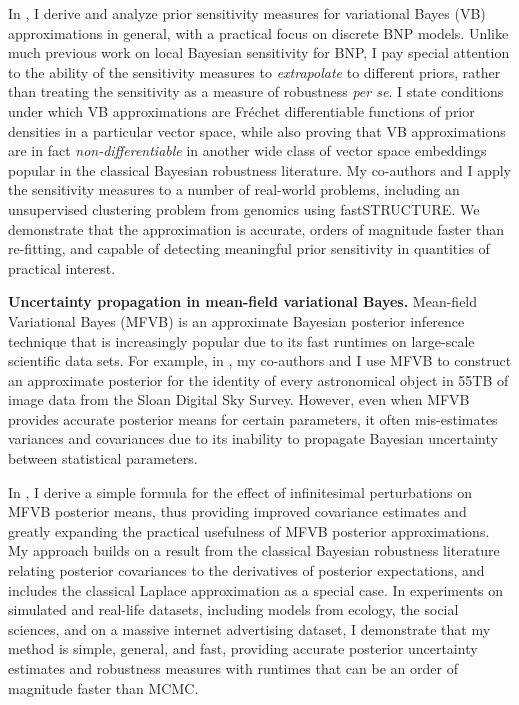In \citet{giordano:2021:bnpsensitivity}, I derive and analyze prior sensitivity
measures for variational Bayes (VB) approximations in general, with a practical
focus on discrete BNP models. Unlike much previous work on local Bayesian
sensitivity for BNP, I pay special
attention to the ability of the sensitivity measures to \emph{extrapolate} to
different priors, rather than treating the sensitivity as a measure of
robustness \textit{per se}.  I state conditions under which VB approximations
are Fr{\'e}chet differentiable functions of prior densities in a particular
vector space, while also proving that VB approximations are in fact
\emph{non-differentiable} in another wide class of vector space embeddings
popular in the classical Bayesian robustness literature.
My co-authors and I apply the sensitivity measures to a number of real-world
problems, including an unsupervised clustering problem from genomics using
fastSTRUCTURE.  We demonstrate that the approximation is accurate, orders of
magnitude faster than re-fitting, and capable of detecting meaningful prior
sensitivity in quantities of practical interest.

\textbf{Uncertainty propagation in mean-field variational Bayes.}
%
Mean-field Variational Bayes (MFVB) is an approximate Bayesian posterior
inference technique that is increasingly popular due to its fast runtimes on
large-scale scientific data sets. For example, in
\citet{regier:2019:cataloging}, my co-authors and I use MFVB to construct an
approximate posterior for the identity of every astronomical object in 55TB
of image data from the Sloan Digital Sky Survey.  However, even when MFVB provides
accurate posterior means for certain parameters, it often mis-estimates
variances and covariances due to its inability to propagate Bayesian uncertainty
between statistical parameters.

In \citet{giordano:2015:linear, giordano:2018:covariances}, I derive a simple
formula for the effect of infinitesimal perturbations on MFVB posterior means,
thus providing improved covariance estimates and greatly expanding the practical
usefulness of MFVB posterior approximations. My approach builds on a result from
the classical Bayesian robustness literature relating posterior covariances to
the derivatives of posterior expectations, and includes the classical Laplace
approximation as a special case. In experiments on simulated and real-life
datasets,  including models from ecology, the social sciences, and on a massive
internet advertising dataset, I demonstrate that my method is simple, general,
and fast, providing accurate posterior uncertainty estimates and robustness
measures with runtimes that can be an order of magnitude faster than MCMC.

